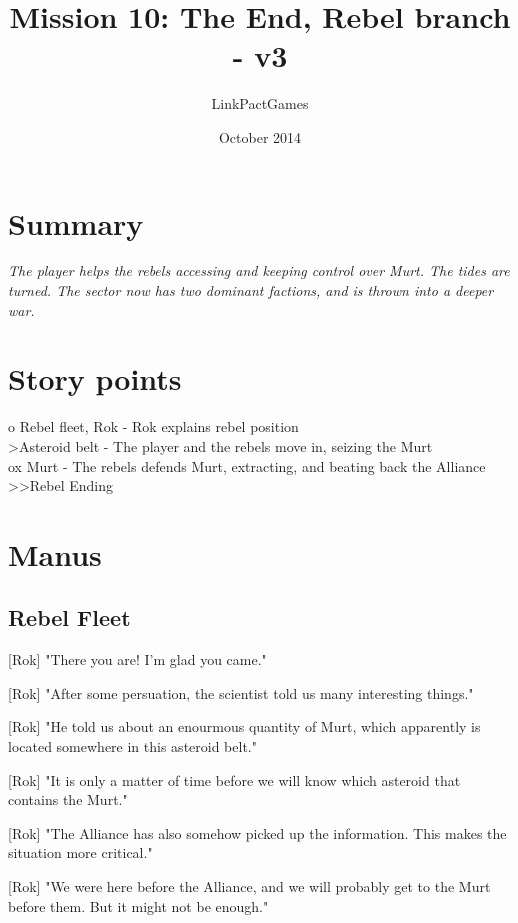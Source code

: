\documentclass[a4paper,12pt]{article}
\begin{document}
\title{Mission 10: The End, Rebel branch - v3}
\author{LinkPactGames}
\date{October 2014}
\maketitle

\section{Summary}

\textit{The player helps the rebels accessing and keeping control over Murt. The tides are turned.
The sector now has two dominant factions, and is thrown into a deeper war.}

\section{Story points}

o Rebel fleet, Rok - Rok explains rebel position\\
\textgreater Asteroid belt - The player and the rebels move in, seizing the Murt\\
ox Murt - The rebels defends Murt, extracting, and beating back the Alliance\\
\textgreater \textgreater Rebel Ending

\section{Manus}

\subsection{Rebel Fleet}

[Rok] "There you are! I'm glad you came."

[Rok] "After some persuation, the scientist told us many interesting things."

[Rok] "He told us about an enourmous quantity of Murt, which apparently is located somewhere in this asteroid belt."

[Rok] "It is only a matter of time before we will know which asteroid that contains the Murt."

[Rok] "The Alliance has also somehow picked up the information. This makes the situation more critical."

[Rok] "We were here before the Alliance, and we will probably get to the Murt before them. But it might not be enough."
\end{document}
